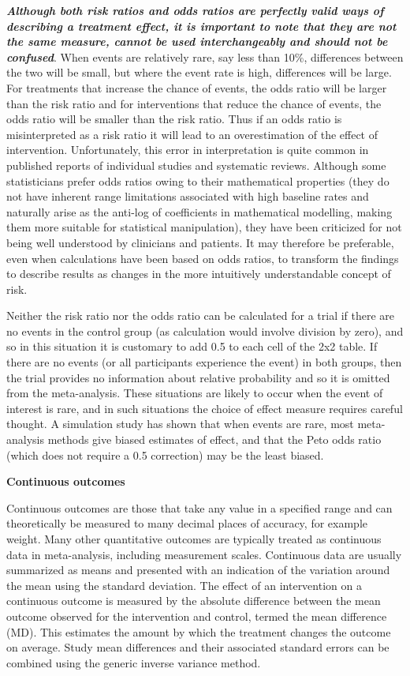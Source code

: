 \documentclass[
  11pt,
  a4paper,
  DIV=11,
  numbers=noendperiod]{scrreprt}
\begin{document}
\textbf{\emph{Although both risk ratios and odds ratios are perfectly
valid ways of describing a treatment effect, it is important to note
that they are not the same measure, cannot be used interchangeably and
should not be confused}}. When events are relatively rare, say less than
10\%, differences between the two will be small, but where the event
rate is high, differences will be large. For treatments that increase
the chance of events, the odds ratio will be larger than the risk ratio
and for interventions that reduce the chance of events, the odds ratio
will be smaller than the risk ratio. Thus if an odds ratio is
misinterpreted as a risk ratio it will lead to an overestimation of the
effect of intervention. Unfortunately, this error in interpretation is
quite common in published reports of individual studies and systematic
reviews. Although some statisticians prefer odds ratios owing to their
mathematical properties (they do not have inherent range limitations
associated with high baseline rates and naturally arise as the anti-log
of coefficients in mathematical modelling, making them more suitable for
statistical manipulation), they have been criticized for not being well
understood by clinicians and patients. It may therefore be preferable,
even when calculations have been based on odds ratios, to transform the
findings to describe results as changes in the more intuitively
understandable concept of risk.

Neither the risk ratio nor the odds ratio can be calculated for a trial
if there are no events in the control group (as calculation would
involve division by zero), and so in this situation it is customary to
add 0.5 to each cell of the 2x2 table. If there are no events (or all
participants experience the event) in both groups, then the trial
provides no information about relative probability and so it is omitted
from the meta-analysis. These situations are likely to occur when the
event of interest is rare, and in such situations the choice of effect
measure requires careful thought. A simulation study has shown that when
events are rare, most meta-analysis methods give biased estimates of
effect, and that the Peto odds ratio (which does not require a 0.5
correction) may be the least biased.

\textbf{Continuous outcomes}

Continuous outcomes are those that take any value in a specified range
and can theoretically be measured to many decimal places of accuracy,
for example weight. Many other quantitative outcomes are typically
treated as continuous data in meta-analysis, including measurement
scales. Continuous data are usually summarized as means and presented
with an indication of the variation around the mean using the standard
deviation. The effect of an intervention on a continuous outcome is
measured by the absolute difference between the mean outcome observed
for the intervention and control, termed the mean difference (MD). This
estimates the amount by which the treatment changes the outcome on
average. Study mean differences and their associated standard errors can
be combined using the generic inverse variance method.
\end{document}
